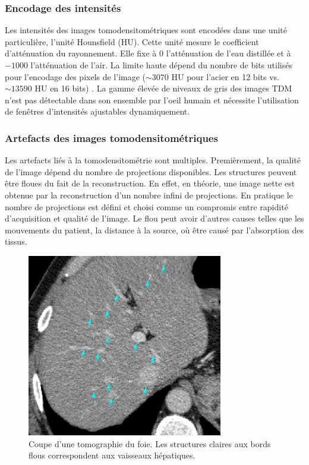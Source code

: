 \subsubsection{Encodage des intensités}
Les intensités des images tomodensitométriques sont encodées dans une unité particulière, l'unité Hounsfield (HU). Cette unité mesure le coefficient d'atténuation du rayonnement. Elle fixe à 0 l'atténuation de l'eau distillée et à $-1000$ l'atténuation de l'air. La limite haute dépend du nombre de bits utilisés pour l'encodage des pixels de l'image ($\sim 3070$ HU pour l'acier en 12 bits vs. $\sim 13590$ HU en 16 bits) \cite{Glide2013_metal_saturation}. La gamme élevée de niveaux de gris des images TDM n'est pas détectable dans son ensemble par l'oeil humain et nécessite l'utilisation de fenêtres d'intensités ajustables dynamiquement.
\subsubsection{Artefacts des images tomodensitométriques}
Les artefacts liés à la tomodensitométrie sont multiples. Premièrement, la qualité de l'image dépend du nombre de projections disponibles. Les structures peuvent être floues du fait de la reconstruction. En effet, en théorie, une image nette est obtenue par la reconstruction d'un nombre infini de projections. En pratique le nombre de projections est défini et choisi comme un compromis entre rapidité d'acquisition et qualité de l'image. Le flou peut avoir d'autres causes telles que les mouvements du patient, la distance à la source, où être causé par l'absorption des tissus. 
\begin{figure}
    \centering
    \includegraphics[height=8cm]{Images/blury_vessels_arrow.png}
    \caption{Coupe d'une tomographie du foie. Les structures claires aux bords flous  correspondent aux vaisseaux hépatiques.}
    \label{fig:CT_blur}
\end{figure}
